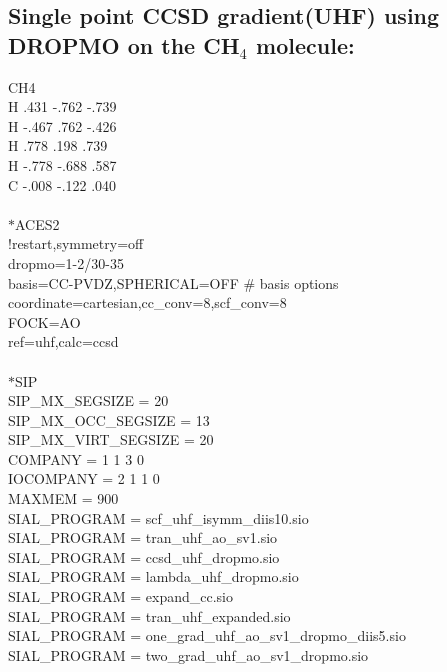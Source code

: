 \documentclass[12pt]{article}
\begin{document}
\subsection{Single point CCSD gradient(UHF) using DROPMO on the CH$_4$ molecule:}
CH4\\ 
H    .431     -.762     -.739\\
H   -.467      .762     -.426\\
H    .778      .198      .739\\
H   -.778     -.688      .587\\
C   -.008     -.122      .040\\
\\
$*$ACES2\\
!restart,symmetry=off\\
dropmo=1-2/30-35\\ 
basis=CC-PVDZ,SPHERICAL=OFF \# basis options\\ 
coordinate=cartesian,cc\_conv=8,scf\_conv=8\\ 
FOCK=AO\\
ref=uhf,calc=ccsd\\ 
\\
$*$SIP\\ 
SIP\_MX\_SEGSIZE      = 20\\
SIP\_MX\_OCC\_SEGSIZE  = 13\\
SIP\_MX\_VIRT\_SEGSIZE = 20\\
COMPANY   = 1 1 3 0\\
IOCOMPANY = 2 1 1 0\\
MAXMEM    = 900\\
SIAL\_PROGRAM = scf\_uhf\_isymm\_diis10.sio\\
SIAL\_PROGRAM = tran\_uhf\_ao\_sv1.sio\\
SIAL\_PROGRAM = ccsd\_uhf\_dropmo.sio\\ 
SIAL\_PROGRAM = lambda\_uhf\_dropmo.sio\\
SIAL\_PROGRAM = expand\_cc.sio\\ 
SIAL\_PROGRAM = tran\_uhf\_expanded.sio\\ 
SIAL\_PROGRAM = one\_grad\_uhf\_ao\_sv1\_dropmo\_diis5.sio\\ 
SIAL\_PROGRAM = two\_grad\_uhf\_ao\_sv1\_dropmo.sio\\ 
\end{document}
